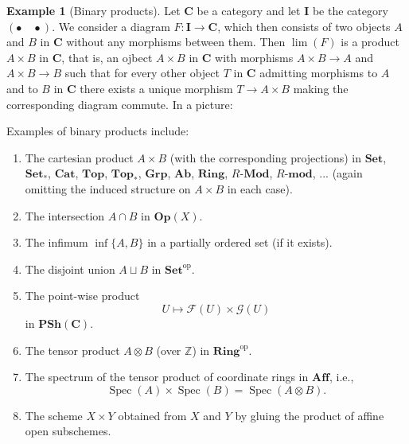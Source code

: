 \documentclass[12pt,a4paper]{amsart}
\theoremstyle{plain}
\theoremstyle{definition}
\newtheorem{exmp}[thm]{Example}
\theoremstyle{remark}
\begin{document}
\begin{exmp}[Binary products]
  Let $\mathbf{C}$ be a category and let $\mathbf{I}$ be the category $(\bullet \quad \bullet)$.
  We consider a diagram $F \colon \mathbf{I} \to \mathbf{C}$, which then consists of two objects $A$ and $B$ in $\mathbf{C}$ without any morphisms between them.
  Then $\lim(F)$ is a product $A \times B$ in $\mathbf{C}$, that is, an ojbect $A \times B$ in $\mathbf{C}$ with morphisms $A \times B \to A$ and $A \times B \to B$ such that for every other object $T$ in $\mathbf{C}$ admitting morphisms to $A$ and to $B$ in $\mathbf{C}$ there exists a unique morphism $T \to A \times B$ making the corresponding diagram commute.
  In a picture:
  \begin{center}
  \end{center}
  Examples of binary products include:
  \begin{enumerate}
    \item The cartesian product $A \times B$ (with the corresponding projections) in $\mathbf{Set}$, $\mathbf{Set}_{*}$, $\mathbf{Cat}$, $\mathbf{Top}$, $\mathbf{Top}_{*}$, $\mathbf{Grp}$, $\mathbf{Ab}$, $\mathbf{Ring}$, $R$-$\mathbf{Mod}$, $R$-$\mathbf{mod}$, ... (again omitting the induced structure on $A \times B$ in each case).
    \item The intersection $A \cap B$ in $\mathbf{Op}(X)$.
    \item The infimum $\operatorname{inf}\{ A, B\}$ in a partially ordered set (if it exists).
    \item The disjoint union $A \sqcup B$ in $\mathbf{Set}^{\mathrm{op}}$.
    \item The point-wise product
      \[ U \mapsto \mathscr{F}(U) \times \mathscr{G}(U) \]
      in $\mathbf{PSh}(\mathbf{C})$.
    \item The tensor product $A \otimes B$ (over $\mathbb{Z}$) in $\mathbf{Ring}^{\mathrm{op}}$.
    \item The spectrum of the tensor product of coordinate rings in $\mathbf{Aff}$, i.e.,
      \[ \operatorname{Spec}(A) \times \operatorname{Spec}(B) = \operatorname{Spec}(A \otimes B). \]
    \item The scheme $X \times Y$ obtained from $X$ and $Y$ by gluing the product of affine open subschemes.

\end{enumerate}
\end{exmp}
\end{document}
